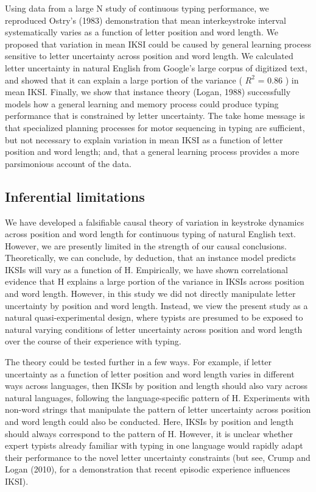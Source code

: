 \documentclass[floatsintext,man]{apa6}
\theoremstyle{definition}
\theoremstyle{definition}
\theoremstyle{definition}
\theoremstyle{remark}
\begin{document}
Using data from a large N study of continuous typing performance, we
reproduced Ostry's (1983) demonstration that mean interkeystroke
interval systematically varies as a function of letter position and word
length. We proposed that variation in mean IKSI could be caused by
general learning process sensitive to letter uncertainty across position
and word length. We calculated letter uncertainty in natural English
from Google's large corpus of digitized text, and showed that it can
explain a large portion of the variance ( \(R^2\) = 0.86 ) in mean IKSI.
Finally, we show that instance theory (Logan, 1988) successfully models
how a general learning and memory process could produce typing
performance that is constrained by letter uncertainty. The take home
message is that specialized planning processes for motor sequencing in
typing are sufficient, but not necessary to explain variation in mean
IKSI as a function of letter position and word length; and, that a
general learning process provides a more parsimonious account of the
data.

\subsection{Inferential limitations}\label{inferential-limitations}

We have developed a falsifiable causal theory of variation in keystroke
dynamics across position and word length for continuous typing of
natural English text. However, we are presently limited in the strength
of our causal conclusions. Theoretically, we can conclude, by deduction,
that an instance model predicts IKSIs will vary as a function of H.
Empirically, we have shown correlational evidence that H explains a
large portion of the variance in IKSIs across position and word length.
However, in this study we did not directly manipulate letter uncertainty
by position and word length. Instead, we view the present study as a
natural quasi-experimental design, where typists are presumed to be
exposed to natural varying conditions of letter uncertainty across
position and word length over the course of their experience with
typing.

The theory could be tested further in a few ways. For example, if letter
uncertainty as a function of letter position and word length varies in
different ways across languages, then IKSIs by position and length
should also vary across natural languages, following the
language-specific pattern of H. Experiments with non-word strings that
manipulate the pattern of letter uncertainty across position and word
length could also be conducted. Here, IKSIs by position and length
should always correspond to the pattern of H. However, it is unclear
whether expert typists already familiar with typing in one language
would rapidly adapt their performance to the novel letter uncertainty
constraints (but see, Crump and Logan (2010), for a demonstration that
recent episodic experience influences IKSI).
\end{document}
